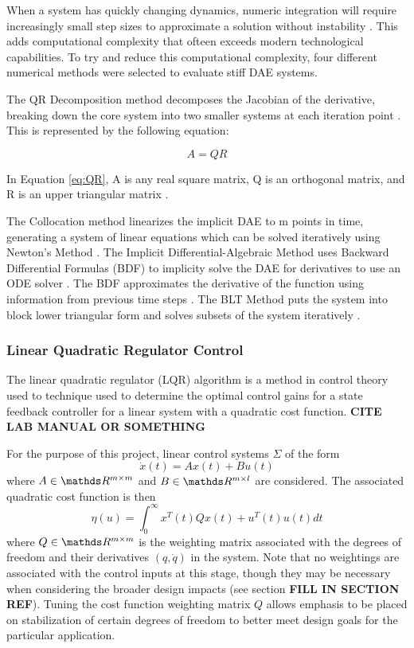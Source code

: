 \par
When a system has quickly changing dynamics, numeric integration will require increasingly small step sizes to approximate a solution without instability \cite{StiffSystem}. 
This adds computational complexity that ofteen exceeds modern technological capabilities. 
To try and reduce this computational complexity, four different numerical methods were selected to evaluate stiff DAE systems.

The QR Decomposition method decomposes the Jacobian of the derivative, breaking down the core system into two smaller systems at each iteration point \cite{Methods}.
This is represented by the following equation:

\begin{equation}
\label{eq:QR}
A = QR
\end{equation}

In Equation \ref{eq:QR}, A is any real square matrix, Q is an orthogonal matrix, and R is an upper triangular matrix \cite{Methods}.

The Collocation method linearizes the implicit DAE to m points in time, generating a system of linear equations which can be solved iteratively using Newton's Method \cite{Methods}.
The Implicit Differential-Algebraic Method uses Backward Differential Formulas (BDF) to implicity solve the DAE for derivatives to use an ODE solver \cite{Methods}. 
The BDF approximates the derivative of the function using information from previous time steps \cite{Methods}.
The BLT Method puts the system into block lower triangular form and solves subsets of the system iteratively \cite{Methods}.

\subsubsection{Linear Quadratic Regulator Control}
The linear quadratic regulator (LQR) algorithm is a method in control theory used to technique used to determine the optimal control gains for a state feedback controller for a linear system with a quadratic cost function. \textbf{CITE LAB MANUAL OR SOMETHING}

For the purpose of this project, linear control systems $\Sigma$ of the form
\begin{equation}
\dot{x}(t) = Ax(t) + Bu(t)
\end{equation}
where $A \in \R^{m \times m}$ and $B \in \R^{m \times l}$ are considered.
The associated quadratic cost function is then 
\begin{equation}
\eta(u) = \int_{0}^{\infty}x^{T}(t)Qx(t)+u^{T}(t)u(t)dt
\end{equation}
where $Q \in \R^{m \times m}$ is the weighting matrix associated with the degrees of freedom and their derivatives $(q, \dot{q})$ in the system. Note that no weightings are associated with the control inputs at this stage, though they may be necessary when considering the broader design impacts (see section \textbf{FILL IN SECTION REF}). Tuning the cost function weighting matrix $Q$ allows emphasis to be placed on stabilization of certain degrees of freedom to better meet design goals for the particular application.

